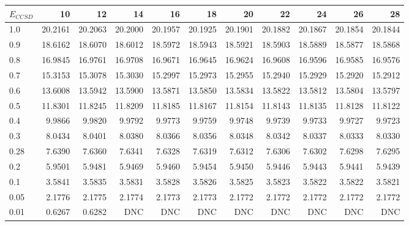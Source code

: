 \begin{landscape}
\begin{table}
\begin{center}
\begin{tabular}{l|rrrrrrrrrr}
\hline 
$E_{CCSD}$ & 10 & 12 & 14 & 16 & 18 & 20 & 22 & 24 & 26 & 28 \\
\hline \hline
1.0 & 20.2161 & 20.2063 & 20.2000 & 20.1957 & 20.1925 & 20.1901 & 20.1882 & 20.1867 & 20.1854 & 20.1844 \\ 
0.9 & 18.6162 & 18.6070 & 18.6012 & 18.5972 & 18.5943 & 18.5921 & 18.5903 & 18.5889 & 18.5877 & 18.5868 \\ 
0.8 & 16.9845 & 16.9761 & 16.9708 & 16.9671 & 16.9645 & 16.9624 & 16.9608 & 16.9596 & 16.9585 & 16.9576 \\ 
0.7 & 15.3153 & 15.3078 & 15.3030 & 15.2997 & 15.2973 & 15.2955 & 15.2940 & 15.2929 & 15.2920 & 15.2912 \\ 
0.6 & 13.6008 & 13.5942 & 13.5900 & 13.5871 & 13.5850 & 13.5834 & 13.5822 & 13.5812 & 13.5804 & 13.5797 \\ 
0.5 & 11.8301 & 11.8245 & 11.8209 & 11.8185 & 11.8167 & 11.8154 & 11.8143 & 11.8135 & 11.8128 & 11.8122 \\ 
0.4 & 9.9866 & 9.9820 & 9.9792 & 9.9773 & 9.9759 & 9.9748       &  9.9739 & 9.9733  &  9.9727 &  9.9723 \\ 
0.3 & 8.0434 & 8.0401 & 8.0380 & 8.0366 & 8.0356 & 8.0348       &  8.0342 & 8.0337  &  8.0333 &  8.0330 \\ 
0.28 & 7.6390 & 7.6360 & 7.6341 & 7.6328 & 7.6319 & 7.6312      &  7.6306 & 7.6302  &  7.6298 &  7.6295 \\ 
0.2 & 5.9501 & 5.9481 & 5.9469 & 5.9460 & 5.9454 & 5.9450       &  5.9446 & 5.9443  &  5.9441 &  5.9439 \\ 
0.1 & 3.5841 & 3.5835 & 3.5831 & 3.5828 & 3.5826 & 3.5825       &  3.5823 & 3.5822  &  3.5822 &  3.5821 \\ 
0.05 & 2.1776 & 2.1775 & 2.1774 & 2.1773 & 2.1773 & 2.1772      &  2.1772 & 2.1772  &  2.1772 &  2.1772 \\ 
0.01 & 0.6267 & 0.6282 & DNC & DNC & DNC & DNC                  &  DNC    & DNC     &  DNC    &     DNC \\ 
\hline \hline
\end{tabular}
\end{center}
\end{table}
\end{landscape}

 
 
